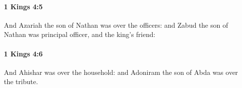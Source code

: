 		\paragraph{1 Kings 4:5} %
			\label{1KINGS-4-5}

			And Azariah the son of Nathan was over the officers: and Zabud the son of Nathan was principal officer, and the king’s friend:


		\paragraph{1 Kings 4:6} %
			\label{1KINGS-4-6}

			And Ahishar was over the household: and Adoniram the son of Abda was over the tribute.


